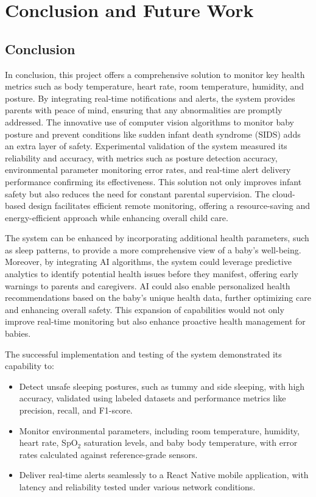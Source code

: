 \documentclass[12pt,a4paper]{report}
\begin{document}
\chapter{Conclusion and Future Work}
\section{Conclusion}
In conclusion, this project offers a comprehensive solution to monitor key health metrics such as body temperature, heart rate, room temperature, humidity, and posture. By integrating real-time notifications and alerts, the system provides parents with peace of mind, ensuring that any abnormalities are promptly addressed. The innovative use of computer vision algorithms to monitor baby posture and prevent conditions like sudden infant death syndrome (SIDS) adds an extra layer of safety. Experimental validation of the system measured its reliability and accuracy, with metrics such as posture detection accuracy, environmental parameter monitoring error rates, and real-time alert delivery performance confirming its effectiveness. This solution not only improves infant safety but also reduces the need for constant parental supervision. The cloud-based design facilitates efficient remote monitoring, offering a resource-saving and energy-efficient approach while enhancing overall child care.

The system can be enhanced by incorporating additional health parameters, such as sleep patterns, to provide a more comprehensive view of a baby's well-being. Moreover, by integrating AI algorithms, the system could leverage predictive analytics to identify potential health issues before they manifest, offering early warnings to parents and caregivers. AI could also enable personalized health recommendations based on the baby's unique health data, further optimizing care and enhancing overall safety. This expansion of capabilities would not only improve real-time monitoring but also enhance proactive health management for babies.

The successful implementation and testing of the system demonstrated its capability to:
\begin{itemize}
    \item Detect unsafe sleeping postures, such as tummy and side sleeping, with high accuracy, validated using labeled datasets and performance metrics like precision, recall, and F1-score.
    \item Monitor environmental parameters, including room temperature, humidity, heart rate, SpO$_2$ saturation levels, and baby body temperature, with error rates calculated against reference-grade sensors.
    \item Deliver real-time alerts seamlessly to a React Native mobile application, with latency and reliability tested under various network conditions.
\end{itemize}
\end{document}
